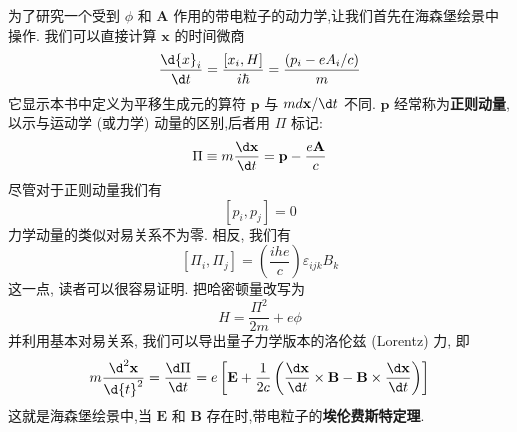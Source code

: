 \documentclass[lang=cn,newtx,10pt,scheme=chinese,thmcnt=section]{elegantbook}
\begin{document}
为了研究一个受到 $\phi$ 和 $\mathbf{A}$ 作用的带电粒子的动力学,让我们首先在海森堡绘景中操作. 我们可以直接计算 $\mathbf{x}$ 的时间微商
\begin{equation}
	\frac{\d {x}_{i}}{\d t} = \frac{\left\lbrack {x}_{i}, H\right\rbrack }{i\hbar } = \frac{\left( {p}_{i} - e{A}_{i}/c\right) }{m}
\end{equation}
它显示本书中定义为平移生成元的算符 $\mathbf{p}$ 与 ${md}\mathbf{x}/{\d t}$ 不同. $\mathbf{p}$ 经常称为\textbf{正则动量},以示与运动学 (或力学) 动量的区别,后者用 $\Pi$ 标记:
\begin{equation}
	\Pi \equiv m\frac{\d \mathbf{x}}{\d t} = \mathbf{p} - \frac{e\mathbf{A}}{c}
\end{equation}
尽管对于正则动量我们有
\begin{equation}
	\left\lbrack {{p}_{i},{p}_{j}}\right\rbrack = 0
\end{equation}
力学动量的类似对易关系不为零. 相反, 我们有
\begin{equation}
	\left\lbrack {{\Pi }_{i},{\Pi }_{j}}\right\rbrack = \left( \frac{ihe}{c}\right) {\varepsilon }_{ijk}{B}_{k}
\end{equation}
这一点, 读者可以很容易证明. 把哈密顿量改写为
\begin{equation}
	H = \frac{{\Pi }^{2}}{2m} + {e\phi }
\end{equation}
并利用基本对易关系, 我们可以导出量子力学版本的洛伦兹 (Lorentz) 力, 即
\begin{equation}
	m\frac{{\d}^{2}\mathbf{x}}{\d{t}^{2}} = \frac{\d \Pi }{\d t} = e\left\lbrack {\mathbf{E} + \frac{1}{2c}\left( {\frac{\d \mathbf{x}}{\d t} \times \mathbf{B} - \mathbf{B} \times \frac{\d \mathbf{x}}{\d t}}\right) }\right\rbrack
\end{equation}
这就是海森堡绘景中,当 $\mathbf{E}$ 和 $\mathbf{B}$ 存在时,带电粒子的\textbf{埃伦费斯特定理}.
\end{document}
